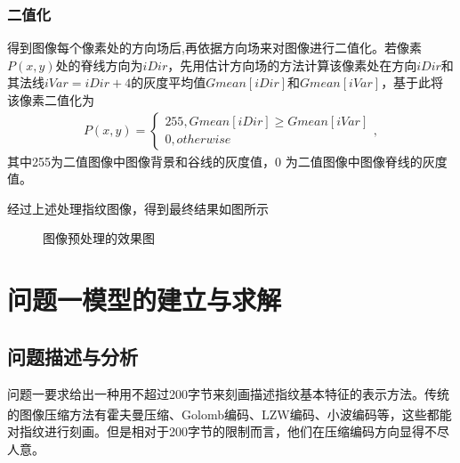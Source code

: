 \documentclass{whutmod}
\newcommand{\upcite}[1]{\textsuperscript{\cite{#1}}}
\begin{document}
\subsubsection{二值化}
得到图像每个像素处的方向场后,再依据方向场来对图像进行二值化。若像素$P(x,y)$处的脊线方向为$iDir$，先用估计方向场的方法计算该像素处在方向$iDir$和其法线$iVar=iDir+4$的灰度平均值$ Gmean[iDir]$和$ Gmean[iVar]$，基于此将该像素二值化为
\begin{gather*}
	P(x,y)=\left\{\begin{matrix}255, Gmean[iDir]\geqslant Gmean[iVar]
		\\ 0,otherwise
	\end{matrix}\right. ,
\end{gather*}
其中255为二值图像中图像背景和谷线的灰度值，0 为二值图像中图像脊线的灰度值。

	经过上述处理指纹图像，得到最终结果如图所示
	       	\begin{figure}[H]	
		\centering
		\caption{图像预处理的效果图}
		\label{zhiwesn}
	\end{figure}
	
	
	\section{问题一模型的建立与求解}
	
		\subsection{问题描述与分析}
			问题一要求给出一种用不超过200字节来刻画描述指纹基本特征的表示方法。传统的图像压缩方法有霍夫曼压缩、Golomb编码、LZW编码、小波编码等\upcite{7,8,9}，这些都能对指纹进行刻画。但是相对于200字节的限制而言，他们在压缩编码方向显得不尽人意。
			
\end{document}

